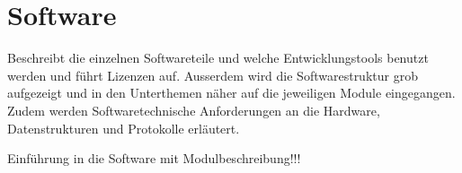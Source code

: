 \section{Software}\label{sec:software}

Beschreibt die einzelnen Softwareteile und welche Entwicklungstools benutzt werden und führt Lizenzen auf. Ausserdem wird die Softwarestruktur grob aufgezeigt und in den Unterthemen näher auf die jeweiligen Module eingegangen. Zudem werden Softwaretechnische Anforderungen an die Hardware, Datenstrukturen und Protokolle erläutert.

Einführung in die Software mit Modulbeschreibung!!!
